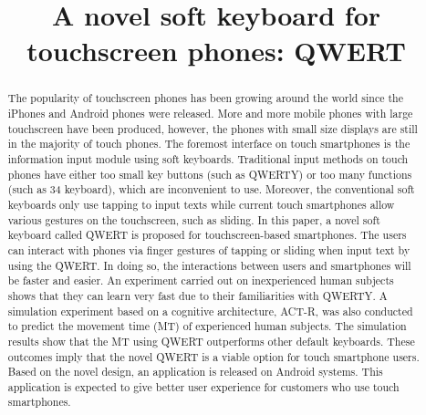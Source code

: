 \documentclass{singlecol-new}
\theoremstyle{TH}{
\newtheorem{lemma}{Lemma}
\newtheorem{theorem}[lemma]{Theorem}
\newtheorem{corrolary}[lemma]{Corrolary}
\newtheorem{conjecture}[lemma]{Conjecture}
\newtheorem{proposition}[lemma]{Proposition}
\newtheorem{claim}[lemma]{Claim}
\newtheorem{stheorem}[lemma]{Wrong Theorem}
\newtheorem{algorithm}{Algorithm}
}
\theoremstyle{THrm}{
\newtheorem{definition}{Definition}[section]
\newtheorem{question}{Question}[section]
\newtheorem{remark}{Remark}
\newtheorem{scheme}{Scheme}
}
\theoremstyle{THhit}{
\newtheorem{case}{Case}[section]
}
\begin{document}
\setcounter{page}{1}






\BottomCatch



\subtitle{}

\title{A novel soft keyboard for touchscreen phones: QWERT}



\begin{abstract}
The popularity of touchscreen phones has been growing around the world since the iPhones and Android phones were released. More and more mobile phones with large touchscreen have been produced, however, the phones with small size displays are still in the majority of touch phones. The foremost interface on touch smartphones is the information input module using soft keyboards. Traditional input methods on touch phones have either too small key buttons (such as QWERTY) or too many functions (such as 34 keyboard), which are inconvenient to use. Moreover, the conventional soft keyboards only use tapping to input texts while current touch smartphones allow various gestures on the touchscreen, such as sliding. In this paper, a novel soft keyboard called QWERT is proposed for touchscreen-based smartphones. The users can interact with phones via finger gestures of tapping or sliding when input text by using the QWERT. In doing so, the interactions between users and smartphones will be faster and easier. An experiment carried out on inexperienced human subjects shows that they can learn very fast due to their familiarities with QWERTY. A simulation experiment based on a cognitive architecture, ACT-R, was also conducted to predict the movement time (MT) of experienced human subjects. The simulation results show that the MT using QWERT outperforms other default keyboards. These outcomes imply that the novel QWERT is a viable option for touch smartphone users. Based on the novel design, an application is released on Android systems. This application is expected to give better user experience for customers who use touch smartphones.
\end{abstract}
\end{document}
